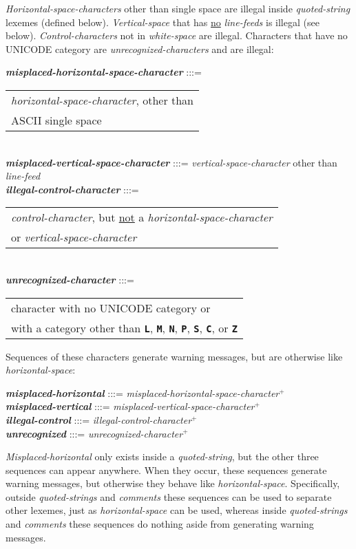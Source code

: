 \documentclass[12pt]{article}
\newcommand{\TT}[1]{{\tt \bfseries #1}}
\newcommand{\emkey}[1]{{\em \bfseries #1}}
\newcommand{\EOL}{\penalty \exhyphenpenalty}
\newcommand{\PLUS}[1][]{{$^{+#1}$}}
\newenvironment{indpar}[1][0.3in]%
	{\begin{list}{}%
		     {\setlength{\itemsep}{0in}%
		      \setlength{\topsep}{0in}%
		      \setlength{\parsep}{1ex}%
		      \setlength{\labelwidth}{#1}%
		      \setlength{\leftmargin}{#1}%
		      \addtolength{\leftmargin}{\labelsep}}%
	 \item}%
	{\end{list}}
\begin{document}
{\em Horizontal-\EOL space-\EOL characters}\label{ILLEGAL-CHARACTERS}
other than single
space are illegal inside {\em quoted-string} lexemes (defined below).
{\em Vertical-space} that has \underline{no} {\em line-feeds} is
illegal (see below).
{\em Control-characters} not in {\em white-space} are illegal.
Characters that have no UNICODE category are {\em unrecognized-characters}
and are illegal:
\begin{indpar}
\emkey{misplaced-horizontal-space-character} :::=
    \begin{tabular}[t]{l}
    {\em horizontal-space-character}, other than \\
    ASCII single space
    \end{tabular}
\\[0.3ex]
\emkey{misplaced-vertical-space-character}
		:::= {\em vertical-space-character}
	other than {\em line-feed}
\\[0.3ex]
\emkey{illegal-control-character} :::=
    \begin{tabular}[t]{l}
    {\em control-character},
    but \underline{not} a {\em horizontal-space-character} \\
    or {\em vertical-space-character}
    \end{tabular}
\\[0.3ex]
\emkey{unrecognized-character} :::=
    \begin{tabular}[t]{l}
    character with no UNICODE category or \\
    with a category other than
    \TT{L}, \TT{M}, \TT{N}, \TT{P}, \TT{S}, \TT{C}, or \TT{Z}
    \end{tabular}
\end{indpar}

Sequences of these characters generate warning messages,
but are otherwise like {\em horizontal-space}:
\begin{indpar}
\emkey{misplaced-horizontal} :::=
    {\em misplaced-horizontal-space-character}\PLUS{}
\\[0.3ex]
\emkey{misplaced-vertical} :::=
    {\em misplaced-vertical-space-character}\PLUS{}
\\[0.3ex]
\emkey{illegal-control} :::= {\em illegal-control-character}\PLUS{}
\\[0.3ex]
\emkey{unrecognized} :::= {\em unrecognized-character}\PLUS{}
\end{indpar}

{\em Misplaced-horizontal} only exists inside a {\em quoted-string},
but the other three sequences can appear anywhere.  When they occur,
these sequences generate warning messages, but otherwise they behave
like {\em horizontal-space}.  Specifically, outside {\em quoted-strings}
and {\em comments} these sequences can be used to separate other lexemes,
just as {\em horizontal-space} can be used,
whereas inside {\em quoted-strings} and
{\em comments} these sequences do nothing aside from generating
warning messages.
\end{document}
